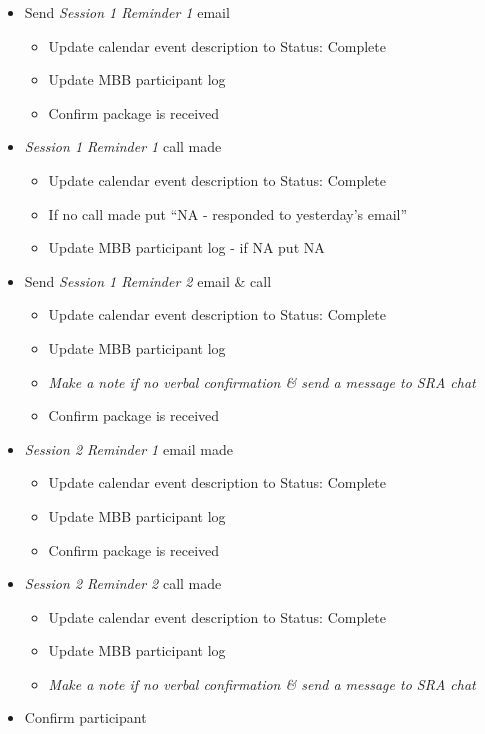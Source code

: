 \documentclass[]{book}
\providecommand{\tightlist}{%
  \setlength{\itemsep}{0pt}\setlength{\parskip}{0pt}}
\begin{document}
\begin{itemize}
\tightlist
\item
  Send \emph{Session 1 Reminder 1} email

  \begin{itemize}
  \tightlist
  \item
    Update calendar event description to Status: Complete
  \item
    Update MBB participant log
  \item
    Confirm package is received
  \end{itemize}
\item
  \emph{Session 1 Reminder 1} call made

  \begin{itemize}
  \tightlist
  \item
    Update calendar event description to Status: Complete
  \item
    If no call made put ``NA - responded to yesterday's email''
  \item
    Update MBB participant log - if NA put NA
  \end{itemize}
\item
  Send \emph{Session 1 Reminder 2} email \& call

  \begin{itemize}
  \tightlist
  \item
    Update calendar event description to Status: Complete
  \item
    Update MBB participant log
  \item
    \emph{Make a note if no verbal confirmation \& send a message to SRA chat}
  \item
    Confirm package is received
  \end{itemize}
\item
  \emph{Session 2 Reminder 1} email made

  \begin{itemize}
  \tightlist
  \item
    Update calendar event description to Status: Complete
  \item
    Update MBB participant log
  \item
    Confirm package is received
  \end{itemize}
\item
  \emph{Session 2 Reminder 2} call made

  \begin{itemize}
  \tightlist
  \item
    Update calendar event description to Status: Complete
  \item
    Update MBB participant log
  \item
    \emph{Make a note if no verbal confirmation \& send a message to SRA chat}
  \end{itemize}
\item
  Confirm participant


\end{itemize}
\end{document}
